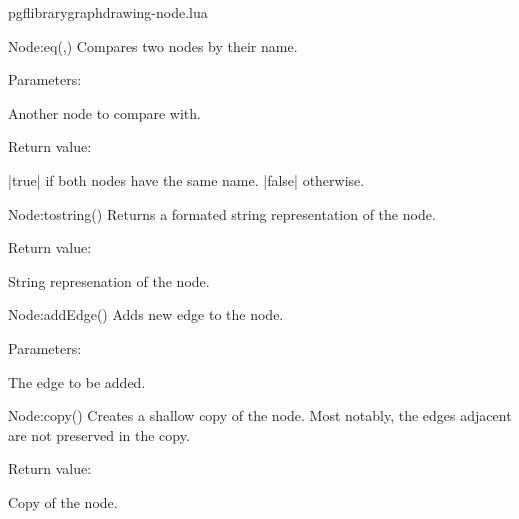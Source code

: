 
\begin{filedescription}{pgflibrarygraphdrawing-node.lua}


\begin{luacommand}{{Node:\textunderscore{}\textunderscore{}eq}(,)}
Compares two nodes by their name. 

Parameters:
\begin{parameterdescription}
	\item[\meta{other}] Another node to compare with. 
\end{parameterdescription}


Return value:
\begin{parameterdescription} 
  \item[] |true| if both nodes have the same name. |false| otherwise. 
\end{parameterdescription}


\end{luacommand}
\begin{luacommand}{{Node:\textunderscore{}\textunderscore{}tostring}()}
Returns a formated string representation of the node. 


Return value:
\begin{parameterdescription} 
  \item[] String represenation of the node. 
\end{parameterdescription}


\end{luacommand}
\begin{luacommand}{{Node:addEdge}()}
Adds new edge to the node. 

Parameters:
\begin{parameterdescription}
	\item[\meta{edge}] The edge to be added. 
\end{parameterdescription}



\end{luacommand}
\begin{luacommand}{{Node:copy}()}
Creates a shallow copy of the node.  Most notably, the edges adjacent are not preserved in the copy. 


Return value:
\begin{parameterdescription} 
  \item[] Copy of the node. 
\end{parameterdescription}



\end{luacommand}
\end{filedescription}
